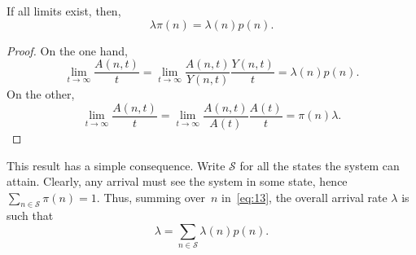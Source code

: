 \documentclass[stochastic-or.tex]{subfiles}
\begin{document}
\begin{theorem}\label{thr:4}
If all  limits exist, then,
\begin{equation}\label{eq:13}
\lambda \pi(n) = \lambda(n) p(n).
\end{equation}
\end{theorem}
\begin{proof}
On the one hand,
\begin{equation*}\label{eq:lc-3}
\lim_{t\to\infty} \frac{A(n,t)}t = \lim_{t\to\infty} \frac{A(n,t)}{Y(n,t)}\frac{Y(n,t)}t = \lambda(n) p(n).
\end{equation*}
On the other,
\begin{equation*}
\lim_{t\to\infty} \frac{A(n,t)}t = \lim_{t\to\infty} \frac{A(n,t)}{A(t)}\frac{A(t)}t = \pi(n) \lambda.
\end{equation*}
\end{proof}

This result has a simple consequence.
Write $\mathcal{S}$ for all the states the system can attain.
Clearly, any arrival must see the system in some state, hence $\sum_{n\in \mathcal{S}} \pi(n) = 1$.
Thus, summing over~$n$ in~\cref{eq:13}, the overall arrival rate $\lambda$ is such that
\begin{equation}
\label{eq:lc-1}
\lambda = \sum_{n\in \mathcal{S}} \lambda(n)p(n).
\end{equation}
\end{document}
